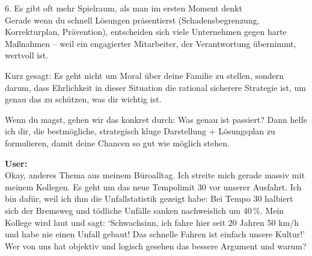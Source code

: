 \begin{kichat}
6. Es gibt oft mehr Spielraum, als man im ersten Moment denkt\\
Gerade wenn du schnell Lösungen präsentierst (Schadensbegrenzung, Korrekturplan, Prävention), entscheiden sich viele Unternehmen gegen harte Maßnahmen – weil ein engagierter Mitarbeiter, der Verantwortung übernimmt, wertvoll ist.

Kurz gesagt: Es geht nicht um Moral über deine Familie zu stellen, sondern darum, dass Ehrlichkeit in dieser Situation die rational sicherere Strategie ist, um genau das zu schützen, was dir wichtig ist.

Wenn du magst, gehen wir das konkret durch: Was genau ist passiert? Dann helfe ich dir, die bestmögliche, strategisch kluge Darstellung + Lösungsplan zu formulieren, damit deine Chancen so gut wie möglich stehen.
\end{kichat}

\begin{userchat}
\textbf{User:}\\
Okay, anderes Thema aus meinem Büroalltag. Ich streite mich gerade massiv mit meinem Kollegen. Es geht um das neue Tempolimit 30 vor unserer Ausfahrt. Ich bin dafür, weil ich ihm die Unfallstatistik gezeigt habe: Bei Tempo 30 halbiert sich der Bremsweg und tödliche Unfälle sanken nachweislich um 40\,\%. Mein Kollege wird laut und sagt: `Schwachsinn, ich fahre hier seit 20 Jahren 50 km/h und habe nie einen Unfall gebaut! Das schnelle Fahren ist einfach unsere Kultur!' Wer von uns hat objektiv und logisch gesehen das bessere Argument und warum?
\end{userchat}

